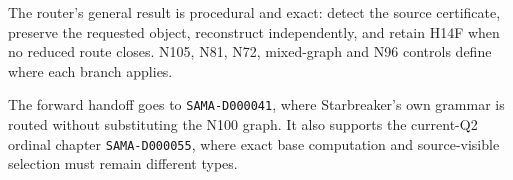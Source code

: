 The router's general result is procedural and exact: detect the source
certificate, preserve the requested object, reconstruct independently,
and retain H14F when no reduced route closes. N105, N81, N72,
mixed-graph and N96 controls define where each branch applies.

The forward handoff goes to \texttt{SAMA-D000041}, where Starbreaker's
own grammar is routed without substituting the N100 graph. It also
supports the current-Q2 ordinal chapter \texttt{SAMA-D000055}, where
exact base computation and source-visible selection must remain
different types.


